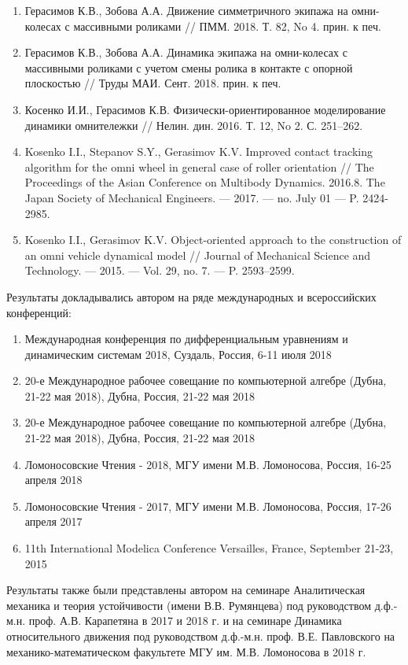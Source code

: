 \begin{enumerate}
	\item Герасимов К.В., Зобова А.А. Движение симметричного экипажа на омни-колесах с массивными роликами // ПММ. 2018. Т. 82, No 4. прин. к печ.
	\item Герасимов К.В., Зобова А.А. Динамика экипажа на омни-колесах с массивными роликами с учетом смены ролика в контакте с опорной плоскостью // Труды МАИ. Сент. 2018. прин. к печ.
	\item Косенко И.И., Герасимов К.В. Физически-ориентированное моделирование динамики омнитележки // Нелин. дин. 2016. Т. 12, No 2. С. 251–262.
	\item Kosenko I.I., Stepanov S.Y., Gerasimov K.V. Improved contact tracking algorithm for the omni wheel in general case of roller orientation // The Proceedings of the Asian Conference on Multibody Dynamics. 2016.8. The Japan Society of Mechanical Engineers. — 2017. — no. July 01 — P. 2424-2985.
	\item Kosenko I.I., Gerasimov K.V. Object-oriented approach to the construction of an omni vehicle dynamical model // Journal of Mechanical Science and Technology. — 2015. — Vol. 29, no. 7. — P. 2593–2599.
\end{enumerate}

Результаты докладывались автором на ряде международных и всероссийских конференций:

\begin{enumerate}
	\item Международная конференция по дифференциальным уравнениям и динамическим системам 2018, Суздаль, Россия, 6-11 июля 2018
	\item 20-е Международное рабочее совещание по компьютерной алгебре (Дубна, 21-22 мая 2018), Дубна, Россия, 21-22 мая 2018
	\item 20-е Международное рабочее совещание по компьютерной алгебре (Дубна, 21-22 мая 2018), Дубна, Россия, 21-22 мая 2018
	\item Ломоносовские Чтения - 2018, МГУ имени М.В. Ломоносова, Россия, 16-25 апреля 2018
	\item Ломоносовские Чтения - 2017, МГУ имени М.В. Ломоносова, Россия, 17-26 апреля 2017
	\item 11th International Modelica Conference Versailles, France, September 21-23, 2015
\end{enumerate}

Результаты также были представлены автором на семинаре Аналитическая механика и теория устойчивости (имени В.В. Румянцева) под руководством д.ф.-м.н. проф. А.В. Карапетяна в 2017 и 2018 г. и на семинаре Динамика относительного движения под руководством д.ф.-м.н. проф. В.Е. Павловского на механико-математическом факультете МГУ им. М.В. Ломоносова в 2018 г.

